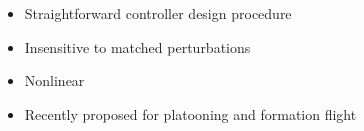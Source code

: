 \documentclass[]{beamer}
\begin{document}

\begin{frame}\frametitle{}
\centering

\begin{tcolorbox}[colback=blue!5!white,colframe=blue!75!black,title=Ideal Sliding Mode Control, width=20em,
standard jigsaw,
opacityback=.7]
\begin{itemize}
\item Straightforward controller design procedure
\item Insensitive to {matched} perturbations
\item Nonlinear
\item Recently proposed for platooning \cite{Fahimi2007} and formation flight \cite{galzi2006uav}
\end{itemize}
\end{tcolorbox}

\end{frame}
\end{document}

